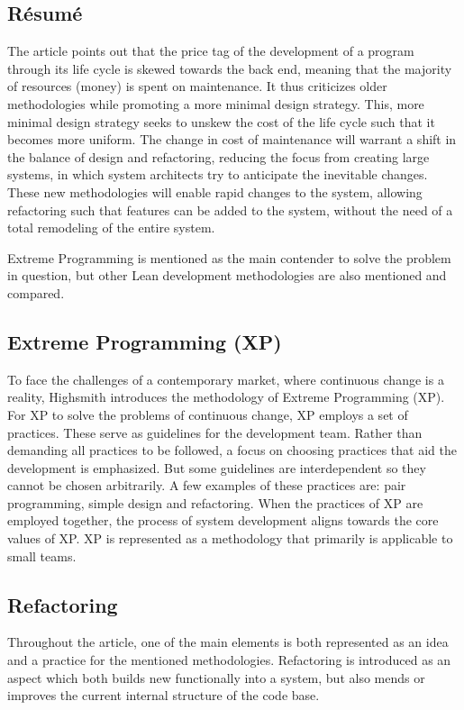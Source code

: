 \documentclass[11pt,a4paper]{report}
\begin{document}
\subsection{Résumé}

The article points out that the price tag of the development of a program through its life cycle is skewed towards the back end, meaning that the majority of resources (money) is spent on maintenance. It thus criticizes older methodologies while promoting a more minimal design strategy. This, more minimal design strategy seeks to unskew the cost of the life cycle such that it becomes more uniform. The change in cost of maintenance will warrant a shift in the balance of design and refactoring, reducing the focus from creating large systems, in which system architects try to anticipate the inevitable changes. These new methodologies will enable rapid changes to the system, allowing refactoring such that features can be added to the system, without the need of a total remodeling of the entire system.

Extreme Programming is mentioned as the main contender to solve the problem in question, but other Lean development methodologies are also mentioned and compared.

\subsection{Extreme Programming (XP)}

To face the challenges of a contemporary market, where continuous change is a reality, Highsmith introduces the methodology of Extreme Programming (XP).
For XP to solve the problems of continuous change, XP employs a set of practices. These serve as guidelines for the development team. Rather than demanding all practices to be followed, a focus on choosing practices that aid the development is emphasized. But some guidelines are interdependent so they cannot be chosen arbitrarily. A few examples of these practices are: pair programming, simple design and refactoring. When the practices of XP are employed together, the process of system development aligns towards the core values of XP. XP is represented as a methodology that primarily is applicable to small teams.


\subsection{Refactoring}
Throughout the article, one of the main elements is both represented as an idea and a practice for the mentioned methodologies. Refactoring is introduced as an aspect which both builds new functionally into a system, but also mends or improves the current internal structure of the code base.
\end{document}
